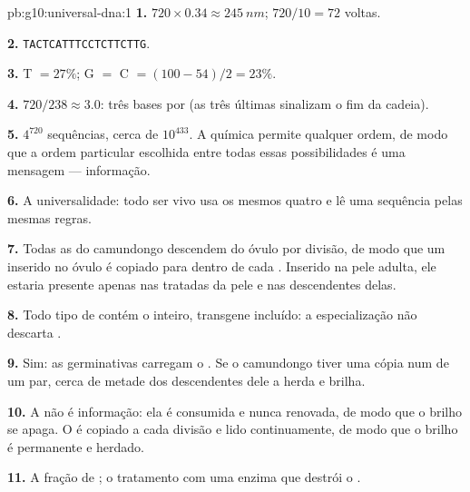 \begin{solution}{pb:g10:universal-dna:1}
\textbf{1.} $720 \times 0.34 \approx \qty{245}{nm}$; $720/10 = 72$
voltas.

\textbf{2.} \texttt{TACTCATTTCCTCTTCTTG}.

\textbf{3.} T $= 27\%$; G $=$ C $= (100 - 54)/2 = 23\%$.

\textbf{4.} $720/238 \approx 3.0$: três bases por  (as três
últimas sinalizam o fim da cadeia).

\textbf{5.} $4^{720}$ sequências, cerca de $10^{433}$. A química
permite qualquer ordem, de modo que a ordem particular escolhida entre
todas essas possibilidades é uma mensagem --- informação.

\textbf{6.} A universalidade: todo ser vivo usa os mesmos quatro
 e lê uma sequência pelas mesmas regras.

\textbf{7.} Todas as  do camundongo descendem do óvulo por
divisão, de modo que um  inserido no óvulo é copiado para dentro de
cada . Inserido na pele adulta, ele estaria presente apenas nas
 tratadas da pele e nas descendentes delas.

\textbf{8.} Todo tipo de  contém o  inteiro, transgene
incluído: a especialização não descarta .

\textbf{9.} Sim: as  germinativas carregam o . Se o
camundongo tiver uma cópia num  de um par, cerca de metade dos
descendentes dele a herda e brilha.

\textbf{10.} A  não é informação: ela é consumida e nunca
renovada, de modo que o brilho se apaga. O  é copiado a cada divisão
e lido continuamente, de modo que o brilho é permanente e herdado.

\textbf{11.} A fração de ; o tratamento com uma enzima que destrói o
.


\end{solution}
